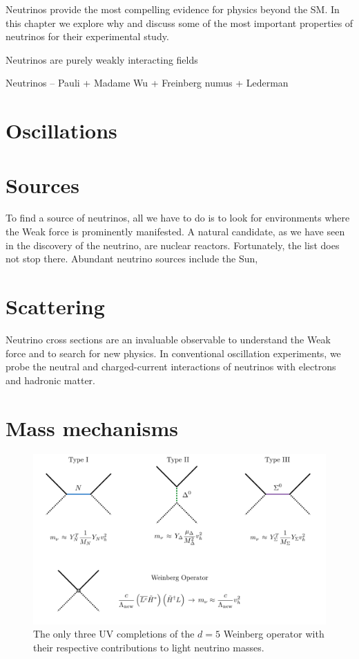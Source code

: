 \graphicspath{{}{theory/}}


Neutrinos provide the most compelling evidence for physics beyond the SM. In this chapter we explore why and discuss some of the most important properties of neutrinos for their experimental study.

Neutrinos are purely weakly interacting fields

Neutrinos -- Pauli + Madame Wu + Freinberg numus + Lederman

\section{Oscillations}

\section{Sources}

To find a source of neutrinos, all we have to do is to look for environments where the Weak force is prominently manifested. A natural candidate, as we have seen in the discovery of the neutrino, are nuclear reactors. Fortunately, the list does not stop there. Abundant neutrino sources include the Sun,

\section{Scattering}

Neutrino cross sections are an invaluable observable to understand the Weak force and to search for new physics. In conventional oscillation experiments, we probe the neutral and charged-current interactions of neutrinos with electrons and hadronic matter. 

\section{Mass mechanisms}

\begin{figure}[t]
\centering
\includegraphics[width=\textwidth]{seesaw_mechanisms.pdf}
\caption[The tree-level UV completions of the Weinberg operator.]{The only three UV completions of the $d=5$ Weinberg operator with their respective contributions to light neutrino masses.\label{fig:seesaw_mechanisms}}
\end{figure}


